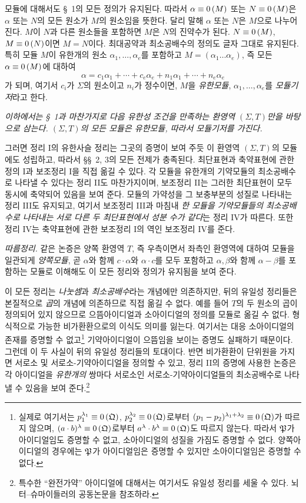 모듈에 대해서도 \S~1의 모든 정의가 유지된다. 따라서 $\alpha\equiv 0\,(M)$ 또는 $N\equiv 0\,(M)$은 $\alpha$ 또는 $N$의 모든 원소가 $M$의 원소임을 뜻한다. 달리 말해 $\alpha$ 또는 $N$은 $M$으로 나누어진다. $M$이 $N$과 다른 원소들을 포함하면 $M$은 $N$의 진약수가 된다. $N\equiv 0\,(M)$, $M\equiv 0\,(N)$이면 $M=N$이다. 최대공약과 최소공배수의 정의도 글자 그대로 유지된다. 특히 모듈 $M$이 유한개의 원소 $\alpha_1,\ldots,\alpha_e$를 포함하고 $M=(\alpha_1\ldots\alpha_e)$, 즉 모든 $\alpha\equiv 0\,(M)$에 대하여
\[
 \alpha=c_1\alpha_1+\cdots+c_e\alpha_e+n_1\alpha_1+\cdots+n_e\alpha_e
\]
가 되며, 여기서 $c_i$가 $\Sigma$의 원소이고 $n_i$가 정수이면, $M$을 \emph{유한모듈}, $\alpha_1,\ldots,\alpha_e$를 \emph{모듈기저}라고 한다.

\emph{이하에서는 \S~1과 마찬가지로 다음 유한성 조건을 만족하는 환영역 $(\Sigma,T)$만을 바탕으로 삼는다. $(\Sigma,T)$의 모든 모듈은 유한모듈, 따라서 모듈기저를 가진다.}

그러면 정리 I의 유한사슬 정리는 그곳의 증명이 보여 주듯 이 환영역 $(\Sigma,T)$의 모듈에도 성립하고, 따라서 \S\S~2, 3의 모든 전제가 충족된다. 최단표현과 축약표현에 관한 정의 I과 보조정리 I을 직접 옮길 수 있다. 각 모듈을 유한개의 기약모듈의 최소공배수로 나타낼 수 있다는 정리 II도 마찬가지이며, 보조정리 II는 그러한 최단표현이 모두 동시에 축약되어 있음을 보여 준다. 모듈의 가약성을 그 보충부분의 성질로 나타내는 정리 III도 유지되고, 여기서 보조정리 III과 마침내 \emph{한 모듈을 기약모듈들의 최소공배수로 나타내는 서로 다른 두 최단표현에서 성분 수가 같다}는 정리 IV가 따른다. 또한 정리 IV는 축약표현에 관한 보조정리 I의 역인 보조정리 IV를 준다.

\emph{따름정리.} 같은 논증은 양쪽 환영역 $T$, 즉 우측이면서 좌측인 환영역에 대하여 모듈을 일관되게 \emph{양쪽모듈}, 곧 $\alpha$와 함께 $c\cdot\alpha$와 $\alpha\cdot c$를 모두 포함하고 $\alpha,\beta$와 함께 $\alpha-\beta$를 포함하는 모듈로 이해해도 이 모든 정리와 정의가 유지됨을 보여 준다.

이 모든 정리는 \emph{나눗셈}과 \emph{최소공배수}라는 개념에만 의존하지만, 뒤의 유일성 정리들은 본질적으로 \emph{곱}의 개념에 의존하므로 직접 옮길 수 없다. 예를 들어 $T$의 두 원소의 곱이 정의되어 있지 않으므로 으뜸아이디얼과 소아이디얼의 정의를 모듈로 옮길 수 없다. 형식적으로 가능한 비가환환으로의 이식도 의미를 잃는다. 여기서는 대응 소아이디얼의 존재를 증명할 수 없고\footnote{실제로 여기서는 $p_1^{\lambda_1}\equiv 0\,(\mathfrak{Q})$, $p_2^{\lambda_2}\equiv 0\,(\mathfrak{Q})$로부터 $(p_1-p_2)^{\lambda_1+\lambda_2}\equiv 0\,(\mathfrak{Q})$가 따르지 않으며, $(a\cdot b)^\lambda\equiv 0\,(\mathfrak{Q})$로부터 $a^\lambda\cdot b^\lambda\equiv 0\,(\mathfrak{Q})$도 따르지 않는다. 따라서 $\mathfrak{P}$가 아이디얼임도 증명할 수 없고, 소아이디얼의 성질을 가짐도 증명할 수 없다. 양쪽아이디얼의 경우에는 $\mathfrak{P}$가 아이디얼임은 증명할 수 있지만 소아이디얼임은 증명할 수 없다.} 기약아이디얼이 으뜸임을 보이는 증명도 실패하기 때문이다. 그런데 이 두 사실이 뒤의 유일성 정리들의 토대이다. 반면 비가환환이 단위원을 가지면 서로소 및 서로소-기약아이디얼을 정의할 수 있고, 정리 II의 증명에 사용한 논증은 각 아이디얼을 \emph{유한개의} 쌍마다 서로소인 서로소-기약아이디얼들의 최소공배수로 나타낼 수 있음을 보여 준다.\footnote{특수한 ``완전가약'' 아이디얼에 대해서는 여기서도 유일성 정리를 세울 수 있다. 뇌터--슈마이들러의 공동논문을 참조하라.}

